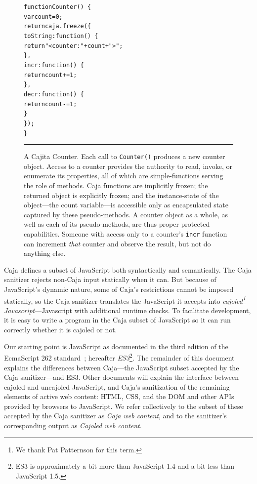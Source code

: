 \documentclass[letterpaper,twocolumn,10pt]{article}
\newcommand{\code}[1]{{\tt {#1}}}              %
\begin{document}
\begin{figure}[t!]
\begin{alltt}
function Counter()\ \{
  var count = 0;
  return caja.freeze(\{
    toString: function()\ \{ 
      return "<counter: " + count + ">"; 
    \},
    incr: function()\ \{ 
      return count += 1; 
    \},
    decr: function()\ \{ 
      return count -= 1; 
    \}
  \});
\}
\end{alltt}

\caption[A Cajita Counter.]{A Cajita Counter. Each call to \code{Counter()} 
produces a new counter object. Access to a counter provides the authority to 
read, invoke, or enumerate its properties, all of which are simple-functions 
serving the role of methods. Caja functions are implicitly frozen; the 
returned object is explicitly frozen; and the instance-state of the 
object---the count variable---is accessible only as encapsulated state 
captured by these pseudo-methods. A counter object as a whole, as well as 
each of its pseudo-methods, are thus proper protected capabilities. Someone 
with access only to a counter's \code{incr} function can increment 
\emph{that} counter and observe the result, but not do anything else.
 \\ } \hrule
\label{fig:cajita-counter}
\end{figure}


Caja defines a subset of JavaScript both syntactically and semantically. The 
Caja sanitizer rejects non-Caja input statically when it can. But because of 
JavaScript's dynamic nature, some of Caja's restrictions cannot be imposed 
statically, so the Caja sanitizer translates the JavaScript it accepts into 
\emph{cajoled\footnote{
%
We thank Pat Patternson for this term.
%
} Javascript}---Javascript with additional runtime checks. To facilitate 
development, it is easy to write a program in the Caja subset of JavaScript 
so it can run correctly whether it is cajoled or not.

Our starting point is JavaScript as documented in the third edition of the 
EcmaScript 262 standard~\cite{ECMA-262}; hereafter \emph{ES3}\footnote{
%
ES3 is approximately a bit more than JavaScript 1.4 and a bit less than 
JavaScript 1.5.
%
}. The remainder of this document explains the differences between Caja---the 
JavaScript subset accepted by the Caja sanitizer---and ES3. Other documents 
will explain the interface between cajoled and uncajoled JavaScript, and 
Caja's sanitization of the remaining elements of active web content: HTML, 
CSS, and the DOM and other APIs provided by browsers to JavaScript. We refer 
collectively to the subset of these accepted by the Caja sanitizer as 
\emph{Caja web content}, and to the sanitizer's corresponding output as 
\emph{Cajoled web content}.
\end{document}
